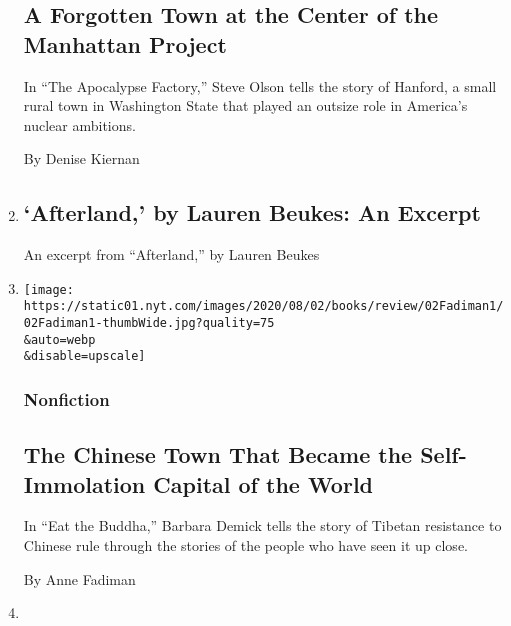 \begin{enumerate}
{  \subsection{A Forgotten Town at the Center of the Manhattan
  Project}\label{a-forgotten-town-at-the-center-of-the-manhattan-project}}

  In ``The Apocalypse Factory,'' Steve Olson tells the story of Hanford,
  a small rural town in Washington State that played an outsize role in
  America's nuclear ambitions.

  By Denise Kiernan
\item
  \href{/2020/07/28/books/review/afterland-by-lauren-beukes-an-excerpt.html}{}

  \hypertarget{afterland-by-lauren-beukes-an-excerpt}{%
  \subsection{`Afterland,' by Lauren Beukes: An
  Excerpt}\label{afterland-by-lauren-beukes-an-excerpt}}

  An excerpt from ``Afterland,'' by Lauren Beukes
\item
  \href{/2020/07/28/books/review/eat-the-buddha-barbara-demick.html}{}

  \texttt{[image: https://static01.nyt.com/images/2020/08/02/books/review/02Fadiman1/02Fadiman1-thumbWide.jpg?quality=75\\\&auto=webp\\\&disable=upscale]}

  \hypertarget{nonfiction-3}{%
  \subsubsection{Nonfiction}\label{nonfiction-3}}

  \hypertarget{the-chinese-town-that-became-the-self-immolation-capital-of-the-world}{%
  \subsection{The Chinese Town That Became the Self-Immolation Capital
  of the
  World}\label{the-chinese-town-that-became-the-self-immolation-capital-of-the-world}}

  In ``Eat the Buddha,'' Barbara Demick tells the story of Tibetan
  resistance to Chinese rule through the stories of the people who have
  seen it up close.

  By Anne Fadiman
\item
  \href{/2020/07/28/books/review/aimee-bender-the-butterfly-lampshade.html}{}


\end{enumerate}
